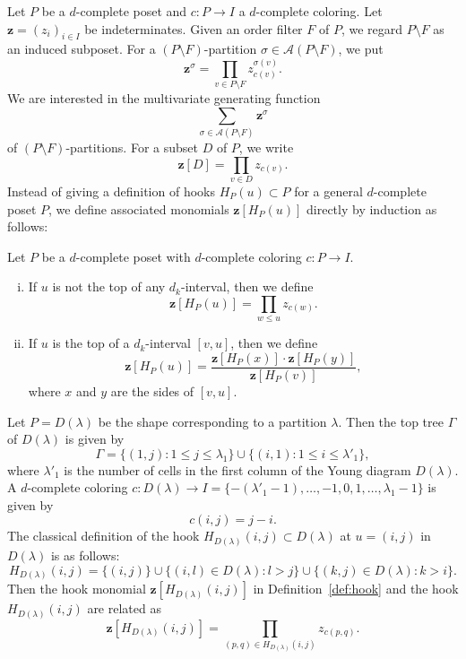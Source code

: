 \documentclass[ALCO,ThmDefs,Unicode,epreuves]{cedram}
\newcommand\vectz{\boldsymbol{z}}
\newcommand\AP{\mathcal{A}}
\begin{document}
Let $P$ be a $d$-complete poset and 
$c : P \to I$ a $d$-complete coloring.
Let $\vectz = (z_i)_{i \in I}$ be indeterminates.
Given an order filter $F$ of $P$, we regard $P \setminus F$ as an induced subposet.
For a $(P \setminus F)$-partition $\sigma \in \AP(P \setminus F)$, we put
$$
\vectz^\sigma = \prod_{v \in P \setminus F} z_{c(v)}^{\sigma(v)}.
$$
We are interested in the multivariate generating function
$$
\sum_{\sigma \in \AP(P \setminus F)} \vectz^\sigma
$$
of $(P \setminus F)$-partitions.
For a subset $D$ of $P$, we write
$$
\vectz[D] = \prod_{v \in D} z_{c(v)}.
$$
Instead of giving a definition of hooks $H_P(u) \subset P$ for a general 
$d$-complete poset $P$, we define associated monomials $\vectz[H_P(u)]$ 
directly by induction as follows:

\begin{defi}
\label{def:hook}
Let $P$ be a $d$-complete poset with $d$-complete coloring $c : P \to I$.
\begin{enumerate}[(i)]
\item\label{defi2.6_i} %
If $u$ is not the top of any $d_k$-interval, then we define
$$
\vectz[H_P(u)] = \prod_{w \le u} z_{c(w)}.
$$
\item\label{defi2.6_ii} %
If $u$ is the top of a $d_k$-interval $[v,u]$, then we define
$$
\vectz[H_P(u)]
 =
\frac{ \vectz[H_P(x)] \cdot \vectz[H_P(y)] }
 { \vectz[H_P(v)] },
$$
where $x$ and $y$ are the sides of $[v,u]$.
\end{enumerate}
\end{defi}

\begin{exam}
\label{ex:shape_hc}
Let $P = D(\lambda)$ be the shape corresponding to a partition $\lambda$.
Then the top tree $\Gamma$ of $D(\lambda)$ is given by
$$
\Gamma = \{ (1,j) : 1 \le j \le \lambda_1 \} \cup \{ (i,1) : 1 \le i \le \lambda'_1 \},
$$
where $\lambda'_1$ is the number of cells in the first column of the Young diagram $D(\lambda)$.
A $d$-complete coloring $c: D(\lambda) \to I = \{ -(\lambda'_1-1), \dots, -1, 0, 1, \dots, \lambda_1-1 \}$ 
is given by
$$
c(i,j) = j-i.
$$
The classical definition of the hook $H_{D(\lambda)}(i,j) \subset D(\lambda)$ 
at $u = (i,j)$ in $D(\lambda)$ is as follows:
$$
H_{D(\lambda)}(i,j)
 =
\{ (i,j) \}
\cup
\{ (i,l) \in D(\lambda) : l > j \}
\cup
\{ (k,j) \in D(\lambda) : k > i \}.
$$
Then the hook monomial $\vectz[H_{D(\lambda)}(i,j)]$ in Definition~\ref{def:hook} 
and the hook $H_{D(\lambda)}(i,j)$ are related as 
$$
\vectz[H_{D(\lambda)}(i,j)]
 =
\prod_{(p,q)\in H_{D(\lambda)}(i,j) } z_{c(p,q)}.
$$
\end{exam}
\end{document}
